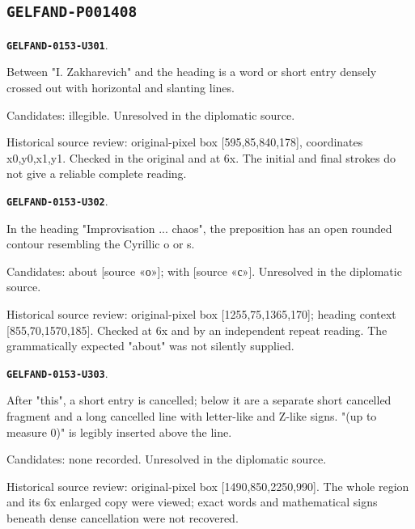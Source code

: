 \documentclass[11pt]{article}
\theoremstyle{definition}
\theoremstyle{remark}
\begin{document}
\subsection*{\texttt{GELFAND-P001408}}
\par\noindent\leavevmode{}\label{GELFAND-0153-U301}\label{GELFAND-P001408:cancelled-title:note}\textbf{\texttt{GELFAND-0153-U301}}.\nopagebreak[4]\par
Between "I. Zakharevich" and the heading is a word or short entry densely crossed out with horizontal and slanting lines.\par
Candidates: illegible. Unresolved in the diplomatic source.\par
Historical source review: original-pixel box [595,85,840,178], coordinates x0,y0,x1,y1. Checked in the original and at 6x. The initial and final strokes do not give a reliable complete reading.\par\medskip
\par\noindent\leavevmode{}\label{GELFAND-0153-U302}\label{GELFAND-P001408:title-preposition:note}\textbf{\texttt{GELFAND-0153-U302}}.\nopagebreak[4]\par
In the heading "Improvisation ... chaos", the preposition has an open rounded contour resembling the Cyrillic o or s.\par
Candidates: about [source «о»]; with [source «с»]. Unresolved in the diplomatic source.\par
Historical source review: original-pixel box [1255,75,1365,170]; heading context [855,70,1570,185]. Checked at 6x and by an independent repeat reading. The grammatically expected "about" was not silently supplied.\par\medskip
\par\noindent\leavevmode{}\label{GELFAND-0153-U303}\label{GELFAND-P001408:baker-cancellations:note}\textbf{\texttt{GELFAND-0153-U303}}.\nopagebreak[4]\par
After "this", a short entry is cancelled; below it are a separate short cancelled fragment and a long cancelled line with letter-like and Z-like signs. "(up to measure 0)" is legibly inserted above the line.\par
Candidates: none recorded. Unresolved in the diplomatic source.\par
Historical source review: original-pixel box [1490,850,2250,990]. The whole region and its 6x enlarged copy were viewed; exact words and mathematical signs beneath dense cancellation were not recovered.\par\medskip
\end{document}
